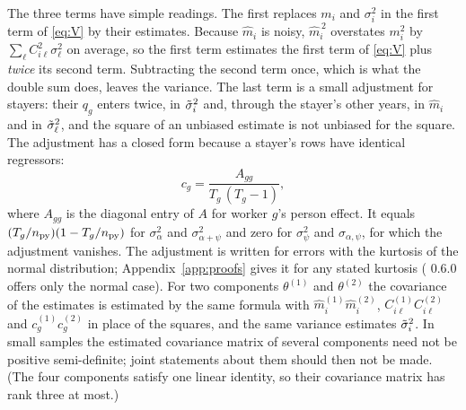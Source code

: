 The three terms have simple readings. The first replaces $m_i$ and $\sigma_i^2$ in the first term of
\eqref{eq:V} by their estimates. Because $\hat m_i$ is noisy, $\hat m_i^{\,2}$ overstates $m_i^2$ by
$\sum_\ell C_{i\ell}^2\sigma_\ell^2$ on average, so the first term estimates the first term of \eqref{eq:V}
plus \emph{twice} its second term. Subtracting the second term once, which is what the double sum does, leaves
the variance. The last term is a small adjustment for stayers: their $q_g$ enters twice, in $\tilde\sigma_i^2$ and,
through the stayer's other years, in $\hat m_i$ and in $\tilde\sigma_\ell^2$, and the square of an unbiased estimate is
not unbiased for the square. The adjustment has a closed form because a stayer's rows have identical
regressors:
\begin{equation}\label{eq:cg}
c_g=\frac{A_{gg}}{T_g\,(T_g-1)},
\end{equation}
where $A_{gg}$ is the diagonal entry of $A$ for worker $g$'s person effect. It equals
$(T_g/n_{\rm py})(1-T_g/n_{\rm py})$ for $\sigma^2_\alpha$ and $\sigma^2_{\alpha+\psi}$ and zero for $\sigma^2_\psi$
and $\sigma_{\alpha,\psi}$, for which the adjustment vanishes. The adjustment is written for errors with the
kurtosis of the normal distribution; Appendix~\ref{app:proofs} gives it for any stated kurtosis (\fevc{} 0.6.0
offers only the normal case). For two
components $\theta^{(1)}$ and $\theta^{(2)}$ the covariance of the estimates is estimated by the same formula
with $\hat m_i^{(1)}\hat m_i^{(2)}$, $C^{(1)}_{i\ell}C^{(2)}_{i\ell}$ and $c^{(1)}_gc^{(2)}_g$ in place of the
squares, and the same variance estimates $\tilde\sigma_i^2$. In small samples the estimated covariance matrix of several
components need not be positive semi-definite; joint statements about them should then not be made. (The four components satisfy
one linear identity, so their covariance matrix has rank three at most.)

